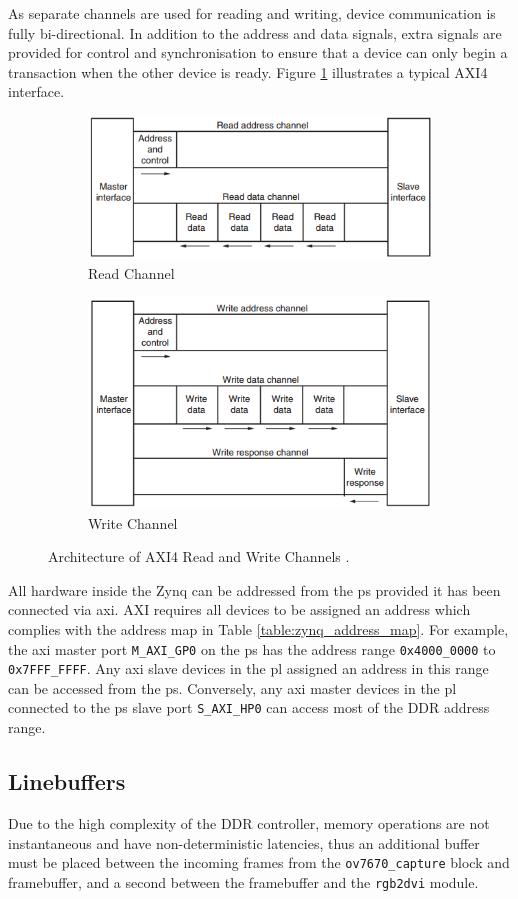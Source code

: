 As separate channels are used for reading and writing, device communication is fully bi-directional. In addition to the address and data signals, extra signals are provided for control and synchronisation to ensure that a device can only begin a transaction when the other device is ready. Figure \ref{fig:axi_architecture} illustrates a typical AXI4 interface. 

\begin{figure}
\centering
\begin{subfigure}{.5\textwidth}
  \centering
  \includegraphics[width=.4\linewidth]{./img/axi_read.png}
  \caption{Read Channel}
\end{subfigure}%
\begin{subfigure}{.5\textwidth}
  \centering
  \includegraphics[width=.4\linewidth]{./img/axi_write.png}
  \caption{Write Channel}
\end{subfigure}
\caption{Architecture of AXI4 Read and Write Channels \cite{xilinx:ug1037}.}
\label{fig:axi_architecture}
\end{figure}

All hardware inside the Zynq can be addressed from the \gls{ps} provided it has been connected via \gls{axi}. AXI requires all devices to be assigned an address which complies with the address map in Table \ref{table:zynq_address_map}. For example, the \gls{axi} master port \texttt{M\_AXI\_GP0} on the \gls{ps} has the address range \texttt{0x4000\_0000} to \texttt{0x7FFF\_FFFF}. Any \gls{axi} slave devices in the \gls{pl} assigned an address in this range can be accessed from the \gls{ps}. Conversely, any \gls{axi} master devices in the \gls{pl} connected to the \gls{ps} slave port \texttt{S\_AXI\_HP0} can access most of the DDR address range.

\subsection{Linebuffers}
Due to the high complexity of the DDR controller, memory operations are not instantaneous and have non-deterministic latencies, thus an additional buffer must be placed between the incoming frames from the \texttt{ov7670\_capture} block and framebuffer, and a second between the framebuffer and the \texttt{rgb2dvi} module.

